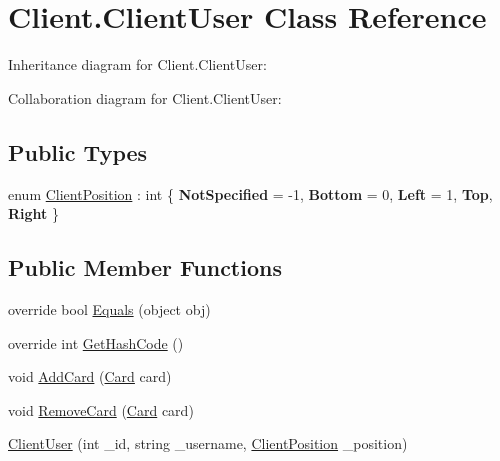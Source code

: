 \hypertarget{class_client_1_1_client_user}{}\section{Client.\+Client\+User Class Reference}
\label{class_client_1_1_client_user}


Inheritance diagram for Client.\+Client\+User\+:


Collaboration diagram for Client.\+Client\+User\+:
\subsection*{Public Types}
\begin{DoxyCompactItemize}
\item 
enum \hyperlink{class_client_1_1_client_user_a346cb93cba9cd67a4de7410a02828cc7}{Client\+Position} \+: int \{ \newline
{\bfseries Not\+Specified} = -\/1, 
{\bfseries Bottom} = 0, 
{\bfseries Left} = 1, 
{\bfseries Top}, 
\newline
{\bfseries Right}
 \}
\end{DoxyCompactItemize}
\subsection*{Public Member Functions}
\begin{DoxyCompactItemize}
\item 
override bool \hyperlink{class_client_1_1_client_user_a515f5e58fe9f58abb63cfff6b9d399f1}{Equals} (object obj)
\item 
override int \hyperlink{class_client_1_1_client_user_a1984c77d9a3444fdda847c6f8e4b1c93}{Get\+Hash\+Code} ()
\item 
void \hyperlink{class_client_1_1_client_user_adc5cda4be6a9fa1dcdf7adb0e18e57b0}{Add\+Card} (\hyperlink{class_game_1_1_card}{Card} card)
\item 
void \hyperlink{class_client_1_1_client_user_a10a7d16ab41f5fcc15e45a0313bfb53e}{Remove\+Card} (\hyperlink{class_game_1_1_card}{Card} card)
\item 
\hyperlink{class_client_1_1_client_user_ac6d81d5908f6afec828a95ca227ba280}{Client\+User} (int \+\_\+id, string \+\_\+username, \hyperlink{class_client_1_1_client_user_a346cb93cba9cd67a4de7410a02828cc7}{Client\+Position} \+\_\+position)
\end{DoxyCompactItemize}
